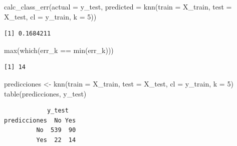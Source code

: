 \documentclass[
  letterpaper,
  DIV=11,
  numbers=noendperiod]{scrartcl}
\newenvironment{Shaded}{\begin{snugshade}}{\end{snugshade}}
\newcommand{\AttributeTok}[1]{\textcolor[rgb]{0.40,0.45,0.13}{#1}}
\newcommand{\DecValTok}[1]{\textcolor[rgb]{0.68,0.00,0.00}{#1}}
\newcommand{\FunctionTok}[1]{\textcolor[rgb]{0.28,0.35,0.67}{#1}}
\newcommand{\NormalTok}[1]{\textcolor[rgb]{0.00,0.23,0.31}{#1}}
\newcommand{\OtherTok}[1]{\textcolor[rgb]{0.00,0.23,0.31}{#1}}
\newcommand{\SpecialCharTok}[1]{\textcolor[rgb]{0.37,0.37,0.37}{#1}}
\begin{document}
\begin{Shaded}
\begin{Highlighting}[]
\FunctionTok{calc\_class\_err}\NormalTok{(}\AttributeTok{actual    =}\NormalTok{ y\_test,}
               \AttributeTok{predicted =} \FunctionTok{knn}\NormalTok{(}\AttributeTok{train =}\NormalTok{ X\_train,}
                               \AttributeTok{test  =}\NormalTok{ X\_test,}
                               \AttributeTok{cl    =}\NormalTok{ y\_train,}
                               \AttributeTok{k     =} \DecValTok{5}\NormalTok{))}
\end{Highlighting}
\end{Shaded}

\begin{verbatim}
[1] 0.1684211
\end{verbatim}

\begin{Shaded}
\begin{Highlighting}[]
\FunctionTok{max}\NormalTok{(}\FunctionTok{which}\NormalTok{(err\_k }\SpecialCharTok{==} \FunctionTok{min}\NormalTok{(err\_k)))}
\end{Highlighting}
\end{Shaded}

\begin{verbatim}
[1] 14
\end{verbatim}

\begin{Shaded}
\begin{Highlighting}[]
\NormalTok{predicciones }\OtherTok{\textless{}{-}} \FunctionTok{knn}\NormalTok{(}\AttributeTok{train =}\NormalTok{ X\_train, }\AttributeTok{test =}\NormalTok{ X\_test, }\AttributeTok{cl =}\NormalTok{ y\_train, }\AttributeTok{k =} \DecValTok{5}\NormalTok{)}
\FunctionTok{table}\NormalTok{(predicciones, y\_test)}
\end{Highlighting}
\end{Shaded}

\begin{verbatim}
            y_test
predicciones  No Yes
         No  539  90
         Yes  22  14
\end{verbatim}
\end{document}
